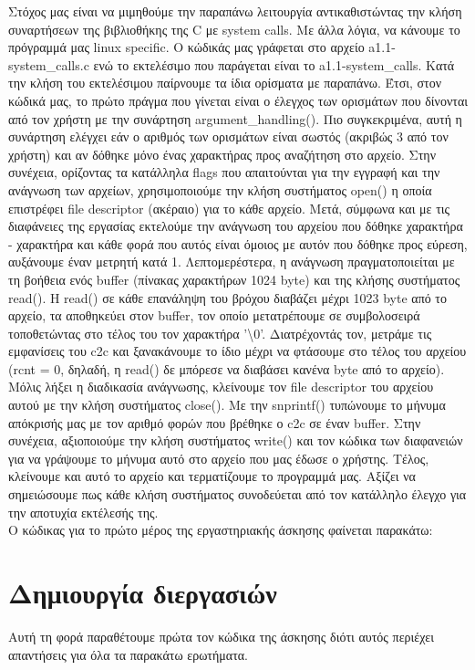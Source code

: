 \documentclass{article}
\begin{document}
	\noindent Στόχος μας είναι να μιμηθούμε την παραπάνω λειτουργία αντικαθιστώντας την κλήση συναρτήσεων της βιβλιοθήκης της C με system calls. Με άλλα λόγια, να κάνουμε το πρόγραμμά μας linux specific. Ο κώδικάς μας γράφεται στο αρχείο a1.1-system\_calls.c ενώ το εκτελέσιμο που παράγεται είναι το a1.1-system\_calls. Κατά την κλήση του εκτελέσιμου παίρνουμε τα ίδια ορίσματα με παραπάνω. Έτσι, στον κώδικά μας, το πρώτο πράγμα που γίνεται είναι ο έλεγχος των ορισμάτων που δίνονται από τον χρήστη με την συνάρτηση argument\_handling(). Πιο συγκεκριμένα, αυτή η συνάρτηση ελέγχει εάν ο αριθμός των ορισμάτων είναι σωστός (ακριβώς 3 από τον χρήστη) και αν δόθηκε μόνο ένας χαρακτήρας προς αναζήτηση στο αρχείο. Στην συνέχεια, ορίζοντας τα κατάλληλα flags που απαιτούνται για την εγγραφή και την ανάγνωση των αρχείων, χρησιμοποιούμε την κλήση συστήματος open() η οποία επιστρέφει file descriptor (ακέραιο) για το κάθε αρχείο. Μετά, σύμφωνα και με τις διαφάνειες της εργασίας εκτελούμε την ανάγνωση του αρχείου που δόθηκε χαρακτήρα - χαρακτήρα και κάθε φορά που αυτός είναι όμοιος με αυτόν που δόθηκε προς εύρεση, αυξάνουμε έναν μετρητή κατά 1. Λεπτομερέστερα, η ανάγνωση πραγματοποιείται με τη βοήθεια ενός buffer (πίνακας χαρακτήρων 1024 byte) και της κλήσης συστήματος read(). Η read() σε κάθε επανάληψη του βρόχου διαβάζει μέχρι 1023 byte από το αρχείο, τα αποθηκεύει στον buffer, τον οποίο μετατρέπουμε σε συμβολοσειρά τοποθετώντας στο τέλος του τον χαρακτήρα '\textbackslash 0'. Διατρέχοντάς τον, μετράμε τις εμφανίσεις του c2c και ξανακάνουμε το ίδιο μέχρι να φτάσουμε στο τέλος του αρχείου (rcnt = 0, δηλαδή, η read() δε μπόρεσε να διαβάσει κανένα byte από το αρχείο). Μόλις λήξει η διαδικασία ανάγνωσης, κλείνουμε τον file descriptor του αρχείου αυτού με την κλήση συστήματος close(). Με την snprintf() τυπώνουμε το μήνυμα απόκρισής μας με τον αριθμό φορών που βρέθηκε ο c2c σε έναν buffer. Στην συνέχεια, αξιοποιούμε την κλήση συστήματος write() και τον κώδικα των διαφανειών για να γράψουμε το μήνυμα αυτό στο αρχείο που μας έδωσε ο χρήστης. Τέλος, κλείνουμε και αυτό το αρχείο και τερματίζουμε το προγραμμά μας. Αξίζει να σημειώσουμε πως κάθε κλήση συστήματος συνοδεύεται από τον κατάλληλο έλεγχο για την αποτυχία εκτέλεσής της. \\
	
	\noindent Ο κώδικας για το πρώτο μέρος της εργαστηριακής άσκησης φαίνεται παρακάτω: \\
	
	
	
	\section{Δημιουργία διεργασιών}
	Αυτή τη φορά παραθέτουμε πρώτα τον κώδικα της άσκησης διότι αυτός περιέχει απαντήσεις για όλα τα παρακάτω ερωτήματα. \\
	
\end{document}
